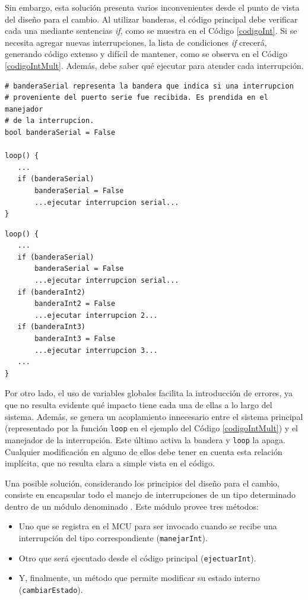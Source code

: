 Sin embargo, esta solución presenta varios inconvenientes desde el punto de vista del diseño para el cambio. Al utilizar banderas, el código principal debe verificar cada una mediante sentencias \textit{if}, como se muestra en el Código \ref{codigoInt}. Si se necesita agregar nuevas interrupciones, la lista de condiciones \textit{if} crecerá, generando código extenso y difícil de mantener, como se observa en el Código \ref{codigoIntMult}. Además, debe saber qué ejecutar para atender cada interrupción. 
\newpage
\begin{lstlisting}[caption=Ejemplo de verificación de bandera de interrupción simple., label=codigoInt]
# banderaSerial representa la bandera que indica si una interrupcion 
# proveniente del puerto serie fue recibida. Es prendida en el manejador
# de la interrupcion.
bool banderaSerial = False

loop() {
   ...
   if (banderaSerial)
       banderaSerial = False
       ...ejecutar interrupcion serial...
}
\end{lstlisting}

\begin{lstlisting}[caption=Ejemplo de verificación de multiples banderas de interrupción., label=codigoIntMult]
loop() {
   ...
   if (banderaSerial)
       banderaSerial = False
       ...ejecutar interrupcion serial...
   if (banderaInt2)
       banderaInt2 = False
       ...ejecutar interrupcion 2...
   if (banderaInt3)
       banderaInt3 = False
       ...ejecutar interrupcion 3...
   ...
}
\end{lstlisting}

Por otro lado, el uso de variables globales facilita la introducción de errores, ya que no resulta evidente qué impacto tiene cada una de ellas a lo largo del sistema. Además, se genera un acoplamiento innecesario entre el sistema principal (representado por la función \verb|loop| en el ejemplo del Código \ref{codigoIntMult}) y el manejador de la interrupción. Este último activa la bandera y \verb|loop| la apaga. Cualquier modificación en alguno de ellos debe tener en cuenta esta relación implícita, que no resulta clara a simple vista en el código.


Una posible solución, considerando los principios del diseño para el cambio, consiste en encapsular todo el manejo de interrupciones de un tipo determinado dentro de un módulo denominado \Manejador. Este módulo provee tres métodos:
\begin{itemize}
\item Uno que se registra en el \gls{MCU} para ser invocado cuando se recibe una interrupción del tipo correspondiente (\verb|manejarInt|).
\item Otro que será ejecutado desde el código principal (\verb|ejectuarInt|).
\item Y, finalmente, un método que permite modificar su estado interno (\verb|cambiarEstado|).
\end{itemize}

